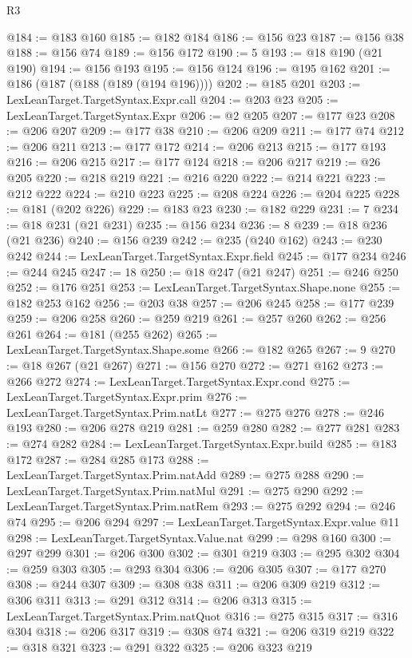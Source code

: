 \begin{lexlean}{R3}
\begin{coremodule}
@184 := @183 @160
@185 := @182 @184
@186 := @156 @23
@187 := @156 @38
@188 := @156 @74
@189 := @156 @172
@190 := 5
@193 := @18 @190 (@21 @190)
@194 := @156 @193
@195 := @156 @124
@196 := @195 @162
@201 := @186 (@187 (@188 (@189 (@194 @196))))
@202 := @185 @201
@203 := LexLeanTarget.TargetSyntax.Expr.call
@204 := @203 @23
@205 := LexLeanTarget.TargetSyntax.Expr
@206 := @2 @205
@207 := @177 @23
@208 := @206 @207
@209 := @177 @38
@210 := @206 @209
@211 := @177 @74
@212 := @206 @211
@213 := @177 @172
@214 := @206 @213
@215 := @177 @193
@216 := @206 @215
@217 := @177 @124
@218 := @206 @217
@219 := @26 @205
@220 := @218 @219
@221 := @216 @220
@222 := @214 @221
@223 := @212 @222
@224 := @210 @223
@225 := @208 @224
@226 := @204 @225
@228 := @181 (@202 @226)
@229 := @183 @23
@230 := @182 @229
@231 := 7
@234 := @18 @231 (@21 @231)
@235 := @156 @234
@236 := 8
@239 := @18 @236 (@21 @236)
@240 := @156 @239
@242 := @235 (@240 @162)
@243 := @230 @242
@244 := LexLeanTarget.TargetSyntax.Expr.field
@245 := @177 @234
@246 := @244 @245
@247 := 18
@250 := @18 @247 (@21 @247)
@251 := @246 @250
@252 := @176 @251
@253 := LexLeanTarget.TargetSyntax.Shape.none
@255 := @182 @253 @162
@256 := @203 @38
@257 := @206 @245
@258 := @177 @239
@259 := @206 @258
@260 := @259 @219
@261 := @257 @260
@262 := @256 @261
@264 := @181 (@255 @262)
@265 := LexLeanTarget.TargetSyntax.Shape.some
@266 := @182 @265
@267 := 9
@270 := @18 @267 (@21 @267)
@271 := @156 @270
@272 := @271 @162
@273 := @266 @272
@274 := LexLeanTarget.TargetSyntax.Expr.cond
@275 := LexLeanTarget.TargetSyntax.Expr.prim
@276 := LexLeanTarget.TargetSyntax.Prim.natLt
@277 := @275 @276
@278 := @246 @193
@280 := @206 @278 @219
@281 := @259 @280
@282 := @277 @281
@283 := @274 @282
@284 := LexLeanTarget.TargetSyntax.Expr.build
@285 := @183 @172
@287 := @284 @285 @173
@288 := LexLeanTarget.TargetSyntax.Prim.natAdd
@289 := @275 @288
@290 := LexLeanTarget.TargetSyntax.Prim.natMul
@291 := @275 @290
@292 := LexLeanTarget.TargetSyntax.Prim.natRem
@293 := @275 @292
@294 := @246 @74
@295 := @206 @294
@297 := LexLeanTarget.TargetSyntax.Expr.value @11
@298 := LexLeanTarget.TargetSyntax.Value.nat
@299 := @298 @160
@300 := @297 @299
@301 := @206 @300
@302 := @301 @219
@303 := @295 @302
@304 := @259 @303
@305 := @293 @304
@306 := @206 @305
@307 := @177 @270
@308 := @244 @307
@309 := @308 @38
@311 := @206 @309 @219
@312 := @306 @311
@313 := @291 @312
@314 := @206 @313
@315 := LexLeanTarget.TargetSyntax.Prim.natQuot
@316 := @275 @315
@317 := @316 @304
@318 := @206 @317
@319 := @308 @74
@321 := @206 @319 @219
@322 := @318 @321
@323 := @291 @322
@325 := @206 @323 @219

\end{coremodule}
\end{lexlean}
